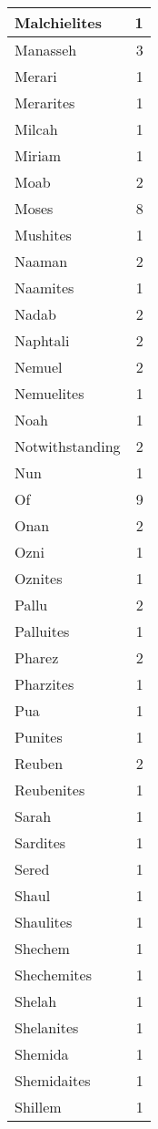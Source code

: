 \begin{center}
\begin{longtable}{l|r}
Malchielites & 1\\ \hline 
Manasseh & 3\\ \hline 
Merari & 1\\ \hline 
Merarites & 1\\ \hline 
Milcah & 1\\ \hline 
Miriam & 1\\ \hline 
Moab & 2\\ \hline 
Moses & 8\\ \hline 
Mushites & 1\\ \hline 
Naaman & 2\\ \hline 
Naamites & 1\\ \hline 
Nadab & 2\\ \hline 
Naphtali & 2\\ \hline 
Nemuel & 2\\ \hline 
Nemuelites & 1\\ \hline 
Noah & 1\\ \hline 
Notwithstanding & 2\\ \hline 
Nun & 1\\ \hline 
Of & 9\\ \hline 
Onan & 2\\ \hline 
Ozni & 1\\ \hline 
Oznites & 1\\ \hline 
Pallu & 2\\ \hline 
Palluites & 1\\ \hline 
Pharez & 2\\ \hline 
Pharzites & 1\\ \hline 
Pua & 1\\ \hline 
Punites & 1\\ \hline 
Reuben & 2\\ \hline 
Reubenites & 1\\ \hline 
Sarah & 1\\ \hline 
Sardites & 1\\ \hline 
Sered & 1\\ \hline 
Shaul & 1\\ \hline 
Shaulites & 1\\ \hline 
Shechem & 1\\ \hline 
Shechemites & 1\\ \hline 
Shelah & 1\\ \hline 
Shelanites & 1\\ \hline 
Shemida & 1\\ \hline 
Shemidaites & 1\\ \hline 
Shillem & 1\\ \hline 

\end{longtable}
\end{center}

